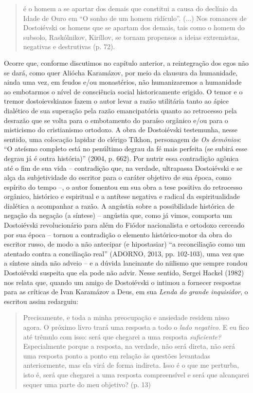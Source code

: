 \begin{quote}
é o homem a se apartar dos demais que constitui a causa do declínio da
Idade de Ouro em ``O sonho de um homem ridículo''. (...) Nos romances de
Dostoiévski os homens que se apartam dos demais, tais como o homem do
subsolo, Raskólnikov, Kiríllov, se tornam propensos a ideias
extremistas, negativas e destrutivas (p. 72).
\end{quote}

Ocorre que, conforme discutimos no capítulo anterior, a reintegração dos
egos não se dará, como quer Aliócha Karamázov, por meio da clausura da
humanidade, ainda uma vez, em feudos e/ou monastérios, não humanizaremos
a humanidade ao embotarmos o nível de consciência social historicamente
erigido. O temor e o tremor dostoievskianos fazem o autor levar a razão
utilitária tanto ao ápice dialético de sua superação pela razão
emancipatória quanto ao retrocesso pela desrazão que se volta para o
embotamento do paraíso orgânico e/ou para o misticismo do cristianismo
ortodoxo. A obra de Dostoiévski testemunha, nesse sentido, uma colocação
lapidar do clérigo Tíkhon, personagem de \emph{Os demônios}: ``O ateísmo
completo está no penúltimo degrau da fé mais perfeita (se subirá esse
degrau já é outra história)'' (2004, p. 662). Por nutrir essa
contradição agônica até o fim de sua vida -- contradição que, na
verdade, ultrapassa Dostoiévski e se alça da subjetividade do escritor
para o caráter objetivo de sua época, como espírito do tempo --, o autor
fomentou em sua obra a tese positiva do retrocesso orgânico, histórico e
espiritual e a antítese negativa e radical da espiritualidade dialética
a acompanhar a razão. A angústia sobre a possibilidade histórica de
negação da negação (a síntese) -- angústia que, como já vimos, comporta
um Dostoiévski revolucionário para além do Fiódor nacionalista e
ortodoxo cerceado por sua época -- tornou a contradição o elemento
histórico-motor da obra do escritor russo, de modo a não antecipar (e
hipostasiar) ``a reconciliação como um atentado contra a conciliação
real'' (ADORNO, 2013, pp. 102-103), uma vez que a síntese ainda não
adveio -- e a dúvida lancinante do niilismo que sempre rondou
Dostoiévski suspeita que ela pode não advir. Nesse sentido, Sergei
Hackel (1982) nos relata que, quando um amigo de Dostoiévski o intimou a
fornecer respostas para as críticas de Ivan Karamázov a Deus, em sua
\emph{Lenda do grande inquisidor}, o escritou assim redarguiu:

\begin{quote}
Precisamente, e toda a minha preocupação e ansiedade residem nisso
agora. O próximo livro trará uma resposta a todo o \emph{lado negativo.}
E eu fico até trêmulo com isso: será que chegarei a uma resposta
\emph{suficiente?} Especialmente porque a resposta, na verdade, não será
direta, não será uma resposta ponto a ponto em relação às questões
levantadas anteriormente, mas ela virá de forma indireta. Isso é o que
me perturba, isto é, será que chegarei a uma resposta compreensível e
será que alcançarei sequer uma parte do meu objetivo? (p. 13)
\end{quote}

